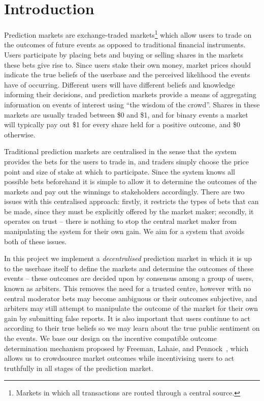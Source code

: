 \section{Introduction}

\label{sec:introduction}

Prediction markets are exchange-traded markets\footnote{Markets in which all
transactions are routed through a central source.} which allow users to trade
on the outcomes of future events as opposed to traditional financial
instruments. Users participate by placing bets and buying or selling shares in
the markets these bets give rise to. Since users stake their own money, market
prices should indicate the true beliefs of the userbase and the perceived
likelihood the events have of occurring. Different users will have different
beliefs and knowledge informing their decisions, and prediction markets provide
a means of aggregating information on events of interest using ``the wisdom of
the crowd''. Shares in these markets are usually traded between \$0 and \$1,
and for binary events a market will typically pay out \$1 for every share held
for a positive outcome, and \$0 otherwise.

Traditional prediction markets are centralised in the sense that the system
provides the bets for the users to trade in, and traders simply choose the
price point and size of stake at which to participate. Since the system knows
all possible bets beforehand it is simple to allow it to determine the outcomes
of the markets and pay out the winnings to stakeholders accordingly. There are
two issues with this centralised approach: firstly, it restricts the types of
bets that can be made, since they must be explicitly offered by the market
maker; secondly, it operates on trust -- there is nothing to stop the central
market maker from manipulating the system for their own gain. We aim for a
system that avoids both of these issues.

In this project we implement a \emph{decentralised} prediction market in which
it is up to the userbase itself to define the markets and determine the
outcomes of these events -- these outcomes are decided upon by consensus among
a group of users, known as arbiters. This removes the need for a trusted
centre, however with no central moderator bets may become ambiguous or their
outcomes subjective, and arbiters may still attempt to manipulate the outcome
of the market for their own gain by submitting false reports. It is also
important that users continue to act according to their true beliefs so we may
learn about the true public sentiment on the events. We base our design on the
incentive compatible outcome determination mechanism proposed by Freeman,
Lahaie, and Pennock~\cite{Freeman2017}, which allows us to crowdsource market
outcomes while incentivising users to act truthfully in all stages of the
prediction market.

